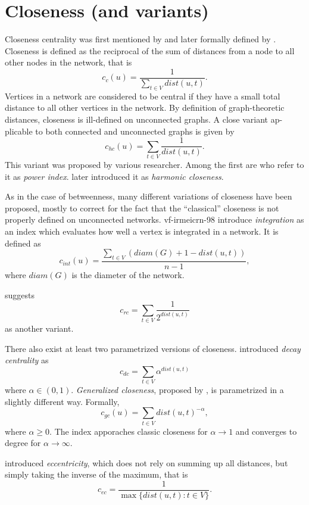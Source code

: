 \documentclass[]{book}
\theoremstyle{definition}
\theoremstyle{definition}
\theoremstyle{definition}
\theoremstyle{remark}
\begin{document}
\hypertarget{closeness-and-variants}{%
\section{Closeness (and variants)}\label{closeness-and-variants}}

Closeness centrality was first mentioned by \citet{b-cptg-50} and later
formally defined by \citet{s-cig-66}. Closeness is defined as the
reciprocal of the sum of distances from a node to all other nodes in the
network, that is \[
c_c(u)=\frac{1}{\sum\limits_{t \in V} dist(u,t)}.
\] Vertices in a network are considered to be central if they have a
small total distance to all other vertices in the network. By definition
of graph-theoretic distances, closeness is ill-defined on unconnected
graphs. A close variant ap- plicable to both connected and unconnected
graphs is given by \[
c_{hc}(u)=\sum\limits_{t \in V}\frac{1}{dist(u,t)}.
\] This variant was proposed by various researcher. Among the first are
\citet{gs-pnm-96} who refer to it as \emph{power index}.
\citet{r-cceughci-09} later introduced it as \emph{harmonic closeness}.

As in the case of betweenness, many different variations of closeness
have been proposed, mostly to correct for the fact that the
``classical'' closeness is not properly defined on unconnected networks.
vf-irmeicrn-98 introduce \emph{integration} as an index which evaluates
how well a vertex is integrated in a network. It is defined as \[
c_{int}(u)=\frac{\sum_{t \in V} (diam(G)+1-dist(u,t))}{n-1},
\] where \(diam(G)\) is the diameter of the network.

\citet{d-rcn-06} suggests \[
c_{rc}=\sum_{t \in V} \frac{1}{2^{dist(u,t)}}
\] as another variant.

There also exist at least two parametrized versions of closeness.
\citet{j-sen-10} introduced \emph{decay centrality} as \[
c_{dc}= \sum_{t \in V} \alpha^{dist(u,t)}
\] where \(\alpha \in (0,1)\). \emph{Generalized closeness}, proposed by
\citet{abe-gbculg-17}, is parametrized in a slightly different way.
Formally, \[
c_{gc}(u)=\sum_{t \in V} dist(u,t)^{-\alpha},
\] where \(\alpha\geq0\). The index apporaches classic closeness for
\(\alpha \to 1\) and converges to degree for \(\alpha \to \infty\).

\citet{hh-ecn-95} introduced \emph{eccentricity}, which does not rely on
summing up all distances, but simply taking the inverse of the maximum,
that is \[
c_{ec}=\frac{1}{\max\{dist(u,t): t\in V\}}.
\]
\end{document}
